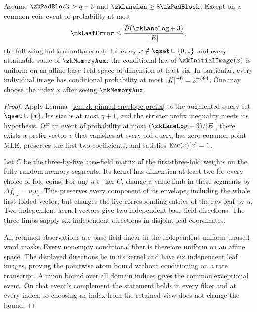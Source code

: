 \begin{theorem}\label{thm:zk-memory-leaf-entropy}
Assume $\zkPadBlock>q+3$ and $\zkLaneLen\ge8\zkPadBlock$. Except on a common coin event of probability at most
\[
 \zkLeafError\le\frac{D(\zkLaneLog+3)}{|\E|},
\]
the following holds simultaneously for every $x\notin\qset\cup\{0,1\}$ and every attainable value of $\zkMemoryAux$: the conditional law of $\zkInitialImage(x)$ is uniform on an affine base-field space of dimension at least six. In particular, every individual image has conditional probability at most $|K|^{-6}=2^{-384}$. One may choose the index $x$ after seeing $\zkMemoryAux$.
\end{theorem}
\begin{proof}
Apply Lemma~\ref{lem:zk-pinned-envelope-prefix} to the augmented query set $\qset\cup\{x\}$. Its size is at most $q+1$, and the stricter prefix inequality meets its hypothesis. Off an event of probability at most $(\zkLaneLog+3)/|\E|$, there exists a prefix vector $v$ that vanishes at every old query, has zero common-point MLE, preserves the first two coefficients, and satisfies $\mathrm{Enc}(v)[x]=1$.

Let $C$ be the three-by-five base-field matrix of the first-three-fold weights on the fully random memory segments. Its kernel has dimension at least two for every choice of fold coins. For any $u\in\ker C$, change a value limb in these segments by $\Delta f_{l,j}=u_l v_j$. This preserves every component of its envelope, including the whole first-folded vector, but changes the five corresponding entries of the raw leaf by $u$. Two independent kernel vectors give two independent base-field directions. The three limbs supply six independent directions in disjoint leaf coordinates.

All retained observations are base-field linear in the independent uniform unused-word masks. Every nonempty conditional fiber is therefore uniform on an affine space. The displayed directions lie in its kernel and have six independent leaf images, proving the pointwise atom bound without conditioning on a rare transcript. A union bound over all domain indices gives the common exceptional event. On that event's complement the statement holds in every fiber and at every index, so choosing an index from the retained view does not change the bound.
\end{proof}


